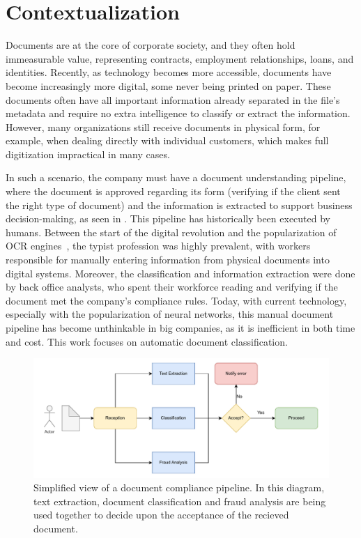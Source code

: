 \section{Contextualization}

Documents are at the core of corporate society, and they often hold immeasurable value, representing contracts, employment relationships, loans, and identities. Recently, as technology becomes more accessible, documents have become increasingly more digital, some never being printed on paper. These documents often have all important information already separated in the file's metadata and require no extra intelligence to classify or extract the information. However, many organizations still receive documents in physical form, for example, when dealing directly with individual customers, which makes full digitization impractical in many cases.

In such a scenario, the company must have a document understanding pipeline, where the document is approved regarding its form (verifying if the client sent the right type of document) and the information is extracted to support business decision-making, as seen in . This pipeline has historically been executed by humans. Between the start of the digital revolution and the popularization of \gls{OCR} engines~\cite{kay_tesseract_2007, mindee_doctr_2021}, the typist profession was highly prevalent, with workers responsible for manually entering information from physical documents into digital systems. Moreover, the classification and information extraction were done by back office analysts, who spent their workforce reading and verifying if the document met the company's compliance rules. Today, with current technology, especially with the popularization of neural networks, this manual document pipeline has become unthinkable in big companies, as it is inefficient in both time and cost. This work focuses on automatic document classification.

\begin{figure}[htbp]
\centering
\includegraphics[width=1\linewidth]{images/diagrama-compliance.drawio.pdf}
\caption{Simplified view of a document compliance pipeline. In this diagram, text extraction, document classification and fraud analysis are being used together to decide upon the acceptance of the recieved document.}
\label{fig:compliance}
\end{figure}

